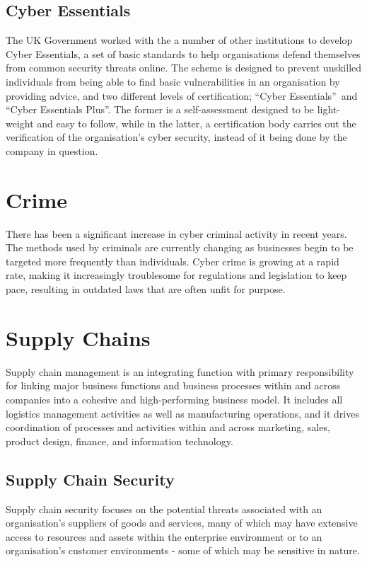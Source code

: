     \subsection{Cyber Essentials}
        The UK Government worked with the a number of other institutions to develop Cyber Essentials, a set of basic standards to help organisations defend themselves from common security threats online. \cite{CyberEssentials} The scheme is designed to prevent unskilled individuals from being able to find basic vulnerabilities in an organisation by providing advice, and two different levels of certification; \textquotedblleft Cyber Essentials\textquotedblright\ and \textquotedblleft Cyber Essentials Plus\textquotedblright. The former is a self-assessment designed to be light-weight and easy to follow, while in the latter, a certification body carries out the verification of the organisation\textquoteright s cyber security, instead of it being done by the company in question.

\section{Crime}
    There has been a significant increase in cyber criminal activity in recent years. \cite{GDPR} The methods used by criminals are currently changing as businesses begin to be targeted more frequently than individuals. \cite{GDPR} Cyber crime is growing at a rapid rate, making it increasingly troublesome for regulations and legislation to keep pace, resulting in outdated laws that are often unfit for purpose. \cite{GDPR}

\section{Supply Chains}
    Supply chain management is an integrating function with primary responsibility for linking major business functions and business processes within and across companies into a cohesive and high-performing business model. \cite{CSCRM} It includes all logistics management activities as well as manufacturing operations, and it drives coordination of processes and activities within and across marketing, sales, product design, finance, and information technology. \cite{CSCRM}

    \subsection{Supply Chain Security}
        Supply chain security focuses on the potential threats associated with an organisation\textquoteright s suppliers of goods and services, many of which may have extensive access to resources and assets within the enterprise environment or to an organisation\textquoteright s customer environments - some of which may be sensitive in nature. \cite{CombattingCyberRisks}

